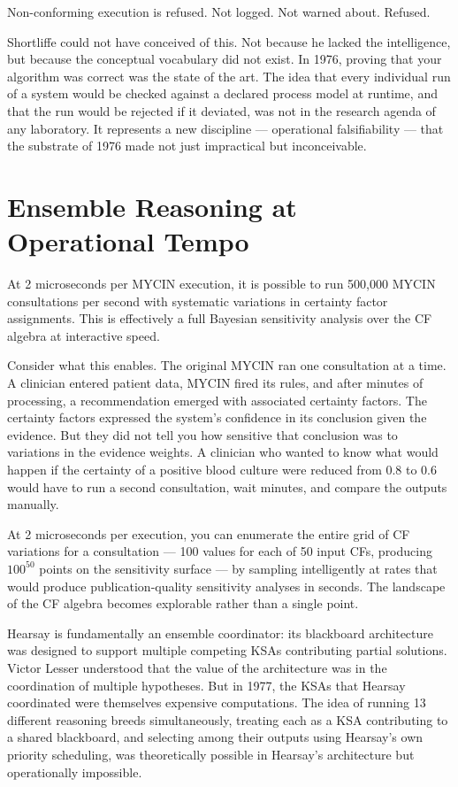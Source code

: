 Non-conforming execution is refused. Not logged. Not warned about. Refused.

Shortliffe could not have conceived of this. Not because he lacked the intelligence, but because
the conceptual vocabulary did not exist. In 1976, proving that your algorithm was correct was
the state of the art. The idea that every individual run of a system would be checked against a
declared process model at runtime, and that the run would be rejected if it deviated, was not
in the research agenda of any laboratory. It represents a new discipline --- operational
falsifiability --- that the substrate of 1976 made not just impractical but inconceivable.

\section{Ensemble Reasoning at Operational Tempo}
\label{sec:ensemble}

At 2 microseconds per MYCIN execution, it is possible to run 500,000 MYCIN consultations per
second with systematic variations in certainty factor assignments. This is effectively a full
Bayesian sensitivity analysis over the CF algebra at interactive speed.

Consider what this enables. The original MYCIN ran one consultation at a time. A clinician
entered patient data, MYCIN fired its rules, and after minutes of processing, a recommendation
emerged with associated certainty factors. The certainty factors expressed the system's
confidence in its conclusion given the evidence. But they did not tell you how sensitive that
conclusion was to variations in the evidence weights. A clinician who wanted to know what would
happen if the certainty of a positive blood culture were reduced from 0.8 to 0.6 would have
to run a second consultation, wait minutes, and compare the outputs manually.

At 2 microseconds per execution, you can enumerate the entire grid of CF variations for a
consultation --- 100 values for each of 50 input CFs, producing $100^{50}$ points on the
sensitivity surface --- by sampling intelligently at rates that would produce publication-quality
sensitivity analyses in seconds. The landscape of the CF algebra becomes explorable rather than
a single point.

Hearsay is fundamentally an ensemble coordinator: its blackboard architecture was designed to
support multiple competing KSAs contributing partial solutions. Victor Lesser understood that
the value of the architecture was in the coordination of multiple hypotheses. But in 1977, the
KSAs that Hearsay coordinated were themselves expensive computations. The idea of running
13 different reasoning breeds simultaneously, treating each as a KSA contributing to a shared
blackboard, and selecting among their outputs using Hearsay's own priority scheduling, was
theoretically possible in Hearsay's architecture but operationally impossible.

